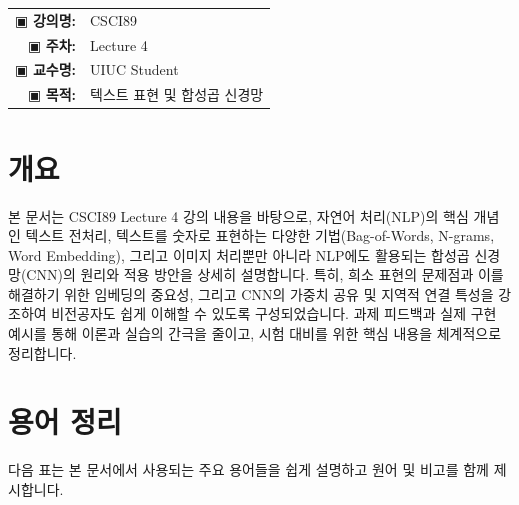 \documentclass[11pt,a4paper]{article}
\makeatletter
\theoremstyle{definition}
\newcommand{\metainfo}[4]{
\begin{tcolorbox}[
    colback=lightpurple,
    colframe=darkpurple,
    boxrule=1pt,
    arc=2mm,
    left=10pt,
    right=10pt,
    top=8pt,
    bottom=8pt
]
\begin{tabular}{@{}rl@{}}
▣ \textbf{강의명:} & #1 \\[0.3em]
▣ \textbf{주차:} & #2 \\[0.3em]
▣ \textbf{교수명:} & #3 \\[0.3em]
▣ \textbf{목적:} & \begin{minipage}[t]{0.75\textwidth}#4\end{minipage}
\end{tabular}
\end{tcolorbox}
}
\makeatother
\begin{document}
\thispagestyle{firstpage}

\metainfo{CSCI89}{Lecture 4}{UIUC Student}{텍스트 표현 및 합성곱 신경망}

\tableofcontents

\newpage

\section{개요}

\begin{tcolorbox}[summarybox, title=\textbf{요약}]
본 문서는 CSCI89 Lecture 4 강의 내용을 바탕으로, 자연어 처리(NLP)의 핵심 개념인 텍스트 전처리, 텍스트를 숫자로 표현하는 다양한 기법(Bag-of-Words, N-grams, Word Embedding), 그리고 이미지 처리뿐만 아니라 NLP에도 활용되는 합성곱 신경망(CNN)의 원리와 적용 방안을 상세히 설명합니다. 특히, 희소 표현의 문제점과 이를 해결하기 위한 임베딩의 중요성, 그리고 CNN의 가중치 공유 및 지역적 연결 특성을 강조하여 비전공자도 쉽게 이해할 수 있도록 구성되었습니다. 과제 피드백과 실제 구현 예시를 통해 이론과 실습의 간극을 줄이고, 시험 대비를 위한 핵심 내용을 체계적으로 정리합니다.
\end{tcolorbox}

\newpage
\section{용어 정리}

다음 표는 본 문서에서 사용되는 주요 용어들을 쉽게 설명하고 원어 및 비고를 함께 제시합니다.
\end{document}
